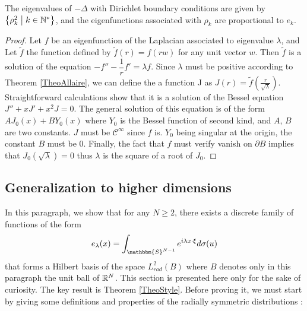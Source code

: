 \documentclass[11pt,a4paper]{article}
\begin{document}
\begin{Prop} The eigenvalues of $-\Delta$ with Dirichlet boundary conditions are given by $\left\{\rho_{k}^2\mathrel{}\middle|\mathrel{}k\in \mathbb{N}^*\right\}$, and the eigenfunctions associated with $\rho_{k}$ are proportional to $e_{k}$. 
\begin{proof}
Let $f$ be an eigenfunction of the Laplacian associated to eigenvalue $\lambda$, and Let $\tilde{f}$ the function defined by $\tilde{f}(r) = f(rw)$ for any unit vector $w$. Then $\tilde{f}$ is a solution of the equation $- f'' - \dfrac{1}{r}f' = \lambda f$. Since $\lambda$ must be positive according to Theorem \ref{TheoAllaire}, we can define the a function J as  $J(r) = \tilde{f}\left(\frac{r}{\sqrt{\lambda}}\right)$. Straightforward calculations show that it is a solution of the Bessel equation $J'' + xJ' + x^2J = 0$. The general solution of this equation is of the form $A J_0(x) + B Y_0(x)$ where $Y_0$ is the Bessel function of second kind, and $A$, $B$ are two constants. $J$ must be $\mathcal{C^\infty}$ since $f$ is. $Y_{0}$ being singular at the origin, the constant $B$ must be $0$. Finally, the fact that $f$ must verify vanish on $\partial B$ implies that $J_0(\sqrt{\lambda}) =0$  thus $\lambda$ is the square of a root of $J_0$. 
\end{proof}
\end{Prop}

\subsection{Generalization to higher dimensions}
In this paragraph, we show that for any $N \geq 2$, there exists a discrete family of functions of the form 
\begin{equation*}
e_\lambda(x) = \int_{\mathbbm{S}^{N-1}} e^{i\lambda x \cdot  \xi} d\sigma(u)
\end{equation*}
that forms a Hilbert basis of the space $L^2_{rad}(B)$ where $B$ denotes only in this paragraph the unit ball of $\mathbb{R}^N$. This section is presented here only for the sake of curiosity. The key result is Theorem \ref{TheoStyle}. Before proving it, we must start by giving some definitions and properties of the radially symmetric distributions : 
\end{document}
